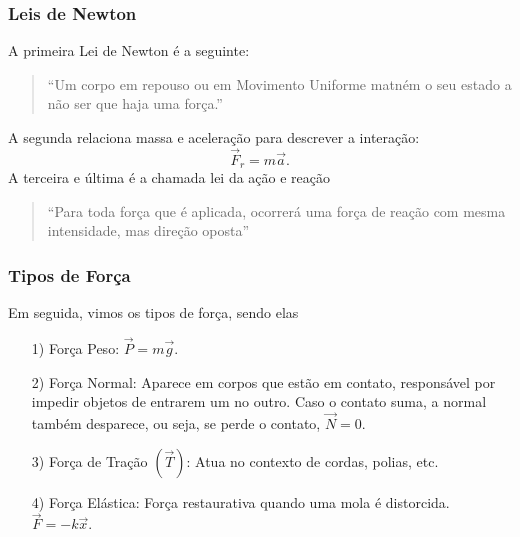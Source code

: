 \documentclass{article}
\begin{document}
  \subsubsection{Leis de Newton}
  A primeira Lei de Newton \'e a seguinte:
 \begin{quote}
   ``Um corpo em repouso ou em Movimento Uniforme matn\'em o seu estado a n\~ao ser que haja uma for\c ca.''
 \end{quote}
  A segunda relaciona massa e acelera\c c\~ao para descrever a intera\c c\~ao: 
    $$
      \vec{F}_{r} = m \vec{a}.
    $$
  A terceira e \'ultima \'e a chamada lei da a\c c\~ao e rea\c c\~ao 
 \begin{quote}
   ``Para toda for\c ca que \'e aplicada, ocorrer\'a uma for\c ca de rea\c c\~ao com mesma intensidade, mas dire\c c\~ao oposta''
 \end{quote}
 \subsubsection{Tipos de For\c ca}
 Em seguida, vimos os tipos de for\c ca, sendo elas 
\begin{itemize}
  \item[1)] For\c ca Peso: $\vec{P} = m \vec{g}.$
  \item[2)] For\c ca Normal: Aparece em corpos que est\~ao em contato, respons\'avel por impedir objetos de entrarem um no outro.
  Caso o contato suma, a normal tamb\'em desparece, ou seja, se perde o contato, $\vec{N} = 0.$
  \item[3)] For\c ca de Tra\c c\~ao $(\vec{T})$: Atua no contexto de cordas, polias, etc.
  \item[4)] For\c ca El\'astica: For\c ca restaurativa quando uma mola \'e distorcida. $\vec{F} = -k \vec{x}.$
\end{itemize}
\end{document}
